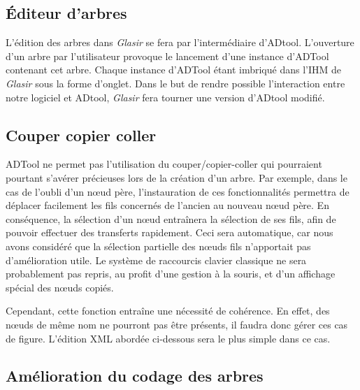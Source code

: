 	\subsection{Éditeur d'arbres}

	L'édition des arbres dans \emph{Glasir} se fera par l'intermédiaire d'ADtool. L'ouverture d'un arbre par l'utilisateur provoque le lancement d'une instance d'ADTool contenant cet arbre. Chaque instance d'ADTool étant imbriqué dans l'IHM de \emph{Glasir} sous la forme d'onglet. Dans le but de rendre possible l'interaction entre notre logiciel et ADtool, \emph{Glasir} fera tourner une version d'ADtool modifié. %

\subsection{Couper copier coller}
	
	ADTool ne permet pas l'utilisation du couper/copier-coller qui pourraient pourtant s'avérer précieuses lors de la création d'un arbre. Par exemple, dans le cas de l'oubli d'un nœud père, l'instauration de ces fonctionnalités permettra de déplacer facilement les fils concernés de l'ancien au nouveau nœud père.
	En conséquence, la sélection d'un nœud entraînera la sélection de ses fils, afin de pouvoir effectuer des transferts rapidement. Ceci sera automatique, car nous avons considéré que la sélection partielle des nœuds fils n'apportait pas d'amélioration utile. Le système de raccourcis clavier classique ne sera probablement pas repris, au profit d'une gestion à la souris, et d'un affichage spécial des nœuds copiés.

	Cependant, cette fonction entraîne une nécessité de cohérence. En effet, des nœuds de même nom ne pourront pas être présents, il faudra donc gérer ces cas de figure. L'édition XML abordée ci-dessous sera le plus simple dans ce cas.

	\subsection{Amélioration du codage des arbres}

